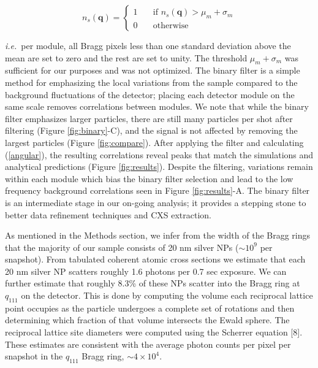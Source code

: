 \documentclass [11pt,fleqn]{article}
\begin{document}
\[  n_{s}(\bm q ) = 
 \begin{cases} 
   1 & \quad \text{if } n_{s}(\bm q ) > \mu_m +  \sigma_m\\
   0 & \quad \text{otherwise} 
 \end{cases} 
 \]

\textit{i.e.}~per module, all Bragg pixels less than one standard deviation above the mean are set to zero and the rest are set to unity. The threshold $\mu_m + \sigma_m$ was sufficient for our purposes and was not optimized. The binary filter is a simple method for emphasizing the local variations from the sample compared to the background fluctuations of the detector; placing each detector module on the same scale removes correlations between modules. We note that while the binary filter emphasizes larger particles, there are still many particles per shot after filtering (Figure \ref{fig:binary}-C), and the signal is not affected by removing the largest particles (Figure \ref{fig:compare}). After applying the filter and calculating (\ref{angular}), the resulting correlations reveal peaks that match the simulations and analytical predictions (Figure \ref{fig:results}). Despite the filtering, variations remain within each module which bias the binary filter selection and lead to the low frequency background correlations seen in Figure \ref{fig:results}-A. The binary filter is an intermediate stage in our on-going analysis; it provides a stepping stone to better data refinement techniques and CXS extraction.

As mentioned in the Methods section, we infer from the width of the Bragg rings that the majority of our sample consists of 20 nm silver NPs ($\sim10^9$ per snapshot). From tabulated coherent atomic cross sections \cite{Henke:1993wx} we estimate that each 20 nm silver NP scatters roughly 1.6 photons per 0.7 sec exposure. We can further estimate that roughly 8.3\% of these NPs scatter into the Bragg ring at $q_{111}$ on the detector. This is done by computing the volume each reciprocal lattice point occupies as the particle undergoes a complete set of rotations and then determining which fraction of that volume intersects the Ewald sphere. The reciprocal lattice site diameters were computed using the Scherrer equation [8]. These estimates are consistent with the average photon counts per pixel per snapshot in the $q_{111}$ Bragg ring, $\sim 4 \times 10^4$. 
\end{document}
